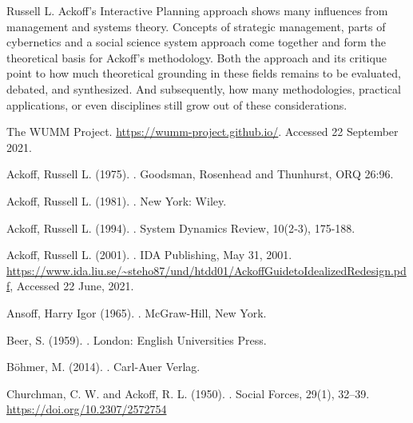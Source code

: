 \documentclass[a4paper,12pt]{scrartcl}
\begin{document}
Russell L. Ackoff's Interactive Planning approach shows many influences from management and systems theory. Concepts of strategic management, parts of cybernetics and a social science system approach come together and form the theoretical basis for Ackoff's methodology.
Both the approach and its critique point to how much theoretical grounding in these fields remains to be evaluated, debated, and synthesized. And subsequently, how many methodologies, practical applications, or even disciplines still grow out of these considerations.


\newpage


\begin{thebibliography}{xxx}

  The WUMM Project.
\newblock\url{https://wumm-project.github.io/}.
\newblock Accessed 22 September 2021.

  Ackoff, Russell L. (1975).
.
\newblock Goodsman, Rosenhead and Thunhurst, ORQ 26:96.

  Ackoff, Russell L. (1981).
.
\newblock New York:	Wiley.

  Ackoff, Russell L. (1994).
.
\newblock System Dynamics Review, 10(2‐3), 175-188.

  Ackoff, Russell L. (2001).
.  
\newblock IDA Publishing, May 31, 2001.
\newblock \url{https://www.ida.liu.se/~steho87/und/htdd01/AckoffGuidetoIdealizedRedesign.pdf},
\newblock Accessed 22 June, 2021.

  Ansoff, Harry Igor (1965).
.
\newblock McGraw-Hill, New York.

 Beer, S. (1959).
.
\newblock London: English Universities Press.

  Böhmer, M. (2014).
.
\newblock Carl-Auer Verlag.

  Churchman, C. W. and Ackoff, R. L. (1950).
.
\newblock Social Forces, 29(1), 32–39.
\newblock \url{https://doi.org/10.2307/2572754}


\end{thebibliography}
\end{document}
